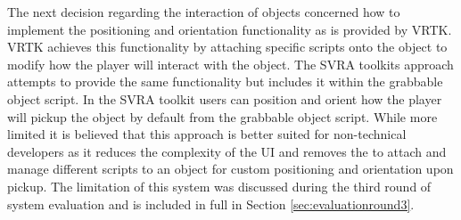 \documentclass{l4proj}
\begin{document}
The next decision regarding the interaction of objects concerned how to implement the positioning and orientation functionality as is provided by VRTK. VRTK achieves this functionality by attaching specific scripts onto the object to modify how the player will interact with the object. The SVRA toolkits approach attempts to provide the same functionality but includes it within the grabbable object script. In the SVRA toolkit users can position and orient how the player will pickup the object by default from the grabbable object script. While more limited it is believed that this approach is better suited for non-technical developers as it reduces the complexity of the UI and removes the to attach and manage different scripts to an object for custom positioning and orientation upon pickup. The limitation of this system was discussed during the third round of system evaluation and is included in full in Section \ref{sec:evaluationround3}.
\end{document}
